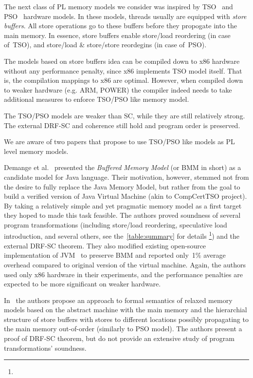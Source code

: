 The next class of PL memory models we consider 
was inspired by TSO~\cite{Sewell-al:CACM10} and PSO~\cite{Sparc:94} 
hardware models. In these models, threads usually 
are equipped with \emph{store buffers}.
All store operations go to these buffers before they 
propogate into the main memory.  
In essence, store buffers enable 
store/load reordering (in case of~TSO),
and store/load \& store/store reordegins (in case of~PSO).

The models based on store buffers idea 
can be compiled down to x86 hardware without any 
performance penalty, since x86 implements TSO model itself.
That is, the compilation mappings to x86 are optimal.
However, when compiled down to weaker hardware (e.g. ARM, POWER)
the compiler indeed needs to take additional measures 
to enforce TSO/PSO like memory model.

The TSO/PSO models are weaker than SC, while 
they are still relatively strong.
The external DRF-SC and coherence still hold
and program order is preserved.

We are aware of two papers that propose to use TSO/PSO 
like models as PL level memory models.

Demange et al.~\cite{Demange-al:POPL13} presented 
the \emph{Buffered Memory Model} (or BMM in short)
as a candidate model for Java language.
Their motivation, however, stemmed not from the desire 
to fully replace the Java Memory Model, but rather 
from the goal to build a verified version of 
Java Virtual Machine (akin to CompCertTSO project).
By taking a relatively simple and yet pragmatic memory model
as a first target they hoped to made this task feasible. 
The authors proved soundness of several program transformations
(including store/load reordering, speculative load introduction,
and several others, see 
the~\cref{table:summary} for details%
\footnote{})
and the external DRF-SC theorem. 
They also modified existing open-source implementation of 
JVM~\cite{Pizlo-al:ECCS10} to preserve BMM and 
reported only~1\% average overhead 
compared to original version of the virtual machine. 
Again, the authors used only x86 hardware in their 
experiments, and the performance penalties 
are expected to be more significant on weaker hardware.   

In~\cite{Boudol-al:POPL09}
the authors propose 
an approach to formal semantics of relaxed memory models 
based on the abstract machine with the main memory 
and the hierarchial structure of store buffers 
with stores to different locations possibly 
propagating to the main memory out-of-order
(similarly to PSO model).
The authors present a proof of DRF-SC theorem,
but do not provide an extensive study 
of program transformations' soundness.

